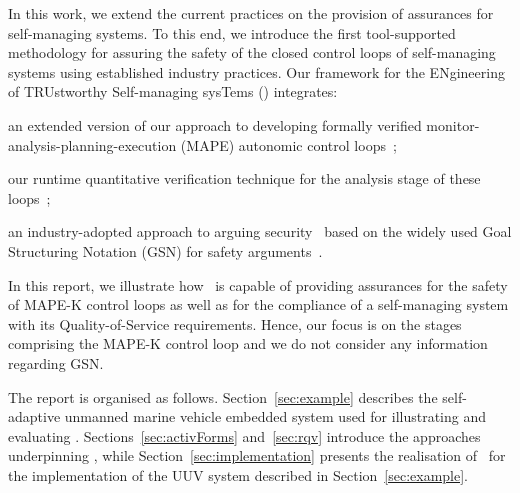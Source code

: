 In this work, we extend the current practices on the provision of assurances for self-managing systems. To this end, we introduce the first tool-supported methodology for assuring the safety of the closed control loops of self-managing systems using established industry practices. Our framework for the ENgineering of TRUstworthy Self-managing sysTems (\approach) integrates:
\squishlist
	\item an extended version of our approach to developing formally verified monitor-analysis-planning-execution (MAPE) autonomic control loops~\cite{Iftikhar2014:SEAMS};
	\item our runtime quantitative verification technique for the analysis stage of these loops~\cite{Calinescu2012:CACM};
	\item an industry-adopted approach to arguing security~\cite{Weinstock2007} based on the widely used Goal Structuring Notation (GSN) for safety arguments~\cite{Kelly2004:DSN}.
\squishend

In this report, we illustrate how \approach\ is capable of providing assurances for the safety of MAPE-K control loops as well as for the compliance of a self-managing system with its Quality-of-Service requirements. Hence, our focus is on the stages comprising the MAPE-K control loop and we do not consider any information regarding GSN.

The report is organised as follows.  Section~\ref{sec:example} describes the self-adaptive unmanned marine vehicle embedded system used for illustrating and evaluating \approach. Sections~\ref{sec:activForms} and~\ref{sec:rqv} introduce the approaches underpinning \approach, while Section~\ref{sec:implementation} presents the realisation of \approach\ for the implementation of the UUV system described in Section~\ref{sec:example}.

